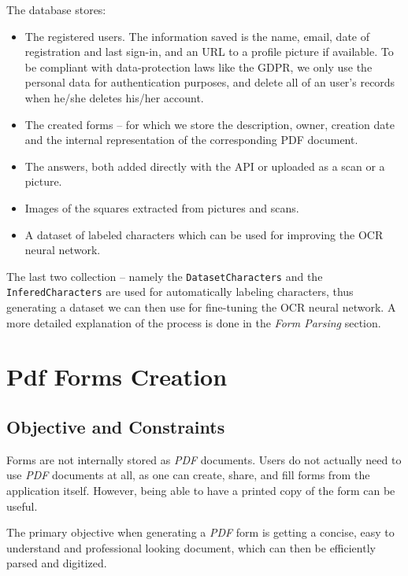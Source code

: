 \documentclass[11pt, a4paper]{report}
\def\code#1{\texttt{#1}}
\begin{document}
The database stores:
\begin{itemize}
    \item The registered users. The information saved is the name, email, date of registration and last sign-in, and an URL to a profile picture if available. To be compliant with data-protection laws like the GDPR, we only use the personal data for authentication purposes, and delete all of an user's records when he/she deletes his/her account.
    \item The created forms -- for which we store the description, owner, creation date and the internal representation of the corresponding PDF document.
    \item The answers, both added directly with the API or uploaded as a scan or a picture.
    \item Images of the squares extracted from pictures and scans.
    \item A dataset of labeled characters which can be used for improving the OCR neural network.
\end{itemize}


The last two collection -- namely the \code{DatasetCharacters} and the \code{InferedCharacters} are used for automatically labeling characters, thus generating a dataset we can then use for fine-tuning the OCR neural network. A more detailed explanation of the process is done in the \textit{Form Parsing} section.


\chapter{Pdf Forms Creation}

\section{Objective and Constraints}

Forms are not internally stored as \textit{PDF} documents. Users do not actually need to use \textit{PDF} documents at all, as one can create, share, and fill forms from the application itself. However, being able to have a printed copy of the form can be useful.

The primary objective when generating a \textit{PDF} form is getting a concise, easy to understand and professional looking document, which can then be efficiently parsed and digitized.
\end{document}
